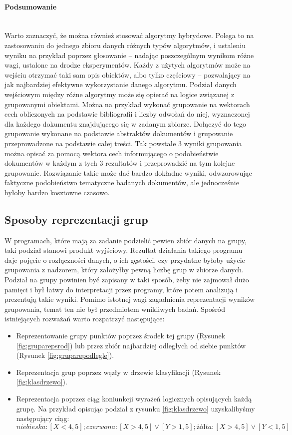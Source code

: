 \documentclass{article}
\newcommand{\myparagraph}[1]{\paragraph{#1}\mbox{}\\}
\begin{document}
\myparagraph{Podsumowanie}

Warto zaznaczyć, że można również stosować algorytmy hybrydowe. Polega to na zastosowaniu do jednego zbioru danych różnych typów algorytmów, i ustaleniu wyniku na przykład poprzez głosowanie – nadając poszczególnym wynikom różne wagi, ustalone na drodze eksperymentów. Każdy z użytych algorytmów może na wejściu otrzymać taki sam opis obiektów, albo tylko częściowy – pozwalający na jak najbardziej efektywne wykorzystanie danego algorytmu. Podział danych wejściowym między różne algorytmy może się opierać na logice związanej z grupowanymi obiektami. Można na przykład wykonać grupowanie na wektorach cech obliczonych na podstawie bibliografii i liczby odwołań do niej, wyznaczonej dla każdego dokumentu znajdującego się w zadanym zbiorze. Dołączyć do tego grupowanie wykonane na podstawie abstraktów dokumentów i grupowanie przeprowadzone na podstawie całej treści. Tak powstałe 3 wyniki grupowania można opisać za pomocą wektora cech informującego o podobieństwie dokumentów w każdym z tych 3 rezultatów i przeprowadzić na tym kolejne grupowanie.
Rozwiązanie takie może dać bardzo dokładne wyniki, odwzorowując faktyczne podobieństwo tematyczne badanych dokumentów, ale jednocześnie byłoby bardzo kosztowne czasowo. 

\subsection{Sposoby reprezentacji grup}

W programach, które mają za zadanie podzielić pewien zbiór danych na grupy, taki podział stanowi produkt wyjściowy. Rezultat działania takiego programu daje pojęcie o rozłączności danych, o ich gęstości, czy przydatne byłoby użycie grupowania z nadzorem, który założyłby pewną liczbę grup w zbiorze danych. Podział na grupy powinien być zapisany w taki sposób, żeby nie zajmował dużo pamięci i był łatwy do interpretacji przez programy, które potem analizują i prezentują takie wyniki. Pomimo istotnej wagi zagadnienia reprezentacji wyników grupowania, temat ten nie był  przedmiotem wnikliwych badań. Spośród istniejących rozważań warto rozpatrzyć następujące:

\begin{itemize}
	\item Reprezentowanie grupy punktów poprzez środek tej grupy (Rysunek \ref{fig:gruparepsrod}) lub przez zbiór najbardziej odległych od siebie punktów (Rysunek \ref{fig:gruparepodlegle}).
	\item Reprezentacja grup poprzez węzły w drzewie klasyfikacji (Rysunek \ref{fig:klasdrzewo}).
	\item Reprezentacja poprzez ciąg koniunkcji wyrażeń logicznych opisujących każdą grupę. Na przykład opisując podział z rysunku \ref{fig:klasdrzewo} uzyskalibyśmy następujący ciąg:
	\[ niebieska:[X<4,5]; czerwona:[X>4,5]\vee[Y>1,5]; żółta:[X>4,5]\vee[Y<1,5] \]
\end{itemize}
\end{document}
